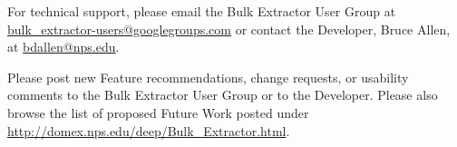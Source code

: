 \documentclass[10pt,twoside]{article}
\newcommand{\bulk}{\emph{bulk\_extractor}\xspace}
\newcommand{\bev}{\emph{BEViewer}\xspace}
\begin{document}
For technical support, please email the Bulk Extractor User Group
at \href{mailto:bulk\_extractor-users@googlegroups.com}{bulk\_extractor-users@googlegroups.com}
or contact the Developer, Bruce Allen, at \href{mailto:bdallen@nps.edu}{bdallen@nps.edu}.

Please post new Feature recommendations, change requests,
or usability comments to the Bulk Extractor User Group or to the Developer.
Please also browse the list of proposed Future Work
posted under \url{http://domex.nps.edu/deep/Bulk\_Extractor.html}.


\cleardoublepage



\cleardoublepage
\printglossaries

\begin{comment}
\section{Vocabulary}
\bev
\bulk
Feature
Feature File
Histogram File
Histogram
Referenced Feature File
Referenced Features
Bookmarked Features
Report
Case
Navigate
Navigation History
Path
Offset
Image File
Image
Address Base
Highlight
Highlight Source
Filter
Log
System Clipboard
Image Reader
\end{comment}
\end{document}

